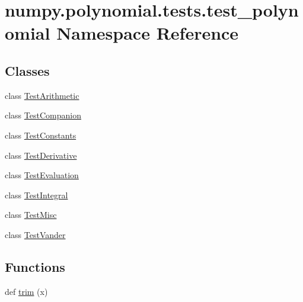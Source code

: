 \hypertarget{namespacenumpy_1_1polynomial_1_1tests_1_1test__polynomial}{}\section{numpy.\+polynomial.\+tests.\+test\+\_\+polynomial Namespace Reference}
\label{namespacenumpy_1_1polynomial_1_1tests_1_1test__polynomial}
\subsection*{Classes}
\begin{DoxyCompactItemize}
\item 
class \hyperlink{classnumpy_1_1polynomial_1_1tests_1_1test__polynomial_1_1TestArithmetic}{Test\+Arithmetic}
\item 
class \hyperlink{classnumpy_1_1polynomial_1_1tests_1_1test__polynomial_1_1TestCompanion}{Test\+Companion}
\item 
class \hyperlink{classnumpy_1_1polynomial_1_1tests_1_1test__polynomial_1_1TestConstants}{Test\+Constants}
\item 
class \hyperlink{classnumpy_1_1polynomial_1_1tests_1_1test__polynomial_1_1TestDerivative}{Test\+Derivative}
\item 
class \hyperlink{classnumpy_1_1polynomial_1_1tests_1_1test__polynomial_1_1TestEvaluation}{Test\+Evaluation}
\item 
class \hyperlink{classnumpy_1_1polynomial_1_1tests_1_1test__polynomial_1_1TestIntegral}{Test\+Integral}
\item 
class \hyperlink{classnumpy_1_1polynomial_1_1tests_1_1test__polynomial_1_1TestMisc}{Test\+Misc}
\item 
class \hyperlink{classnumpy_1_1polynomial_1_1tests_1_1test__polynomial_1_1TestVander}{Test\+Vander}
\end{DoxyCompactItemize}
\subsection*{Functions}
\begin{DoxyCompactItemize}
\item 
def \hyperlink{namespacenumpy_1_1polynomial_1_1tests_1_1test__polynomial_a9672ff7bc87d59de5222454a5d4d7faf}{trim} (x)
\end{DoxyCompactItemize}
